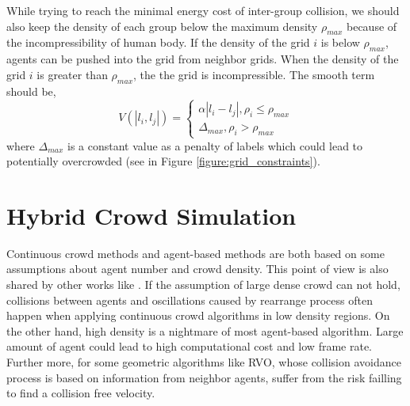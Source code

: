 \documentclass{egpubl}
\begin{document}
While trying to reach the minimal energy cost of inter-group collision, we should also keep the density of each group below the maximum density $\rho_{max}$ because of the incompressibility of human body. If the density of the grid $i$ is below $\rho_{max}$, agents can be pushed into the grid from neighbor grids. When the density of the grid $i$ is greater than $\rho_{max}$, the the grid is incompressible. The smooth term should be,
\begin{equation}
\label{eq:7}
V(\left|l_i,l_j\right|) = \left\{ 
{\begin{array}
{*{20}{c}}
{\alpha \left| {{l_i} - {l_j}} \right|,  {\rho _i} \le {\rho _{max}}}\\
{\Delta _{max},  {\rho _i} > {\rho _{max}}}
\end{array}} 
\right.
\end{equation}
where $\Delta_{max}$ is a constant value as a penalty of labels which could lead to potentially overcrowded (see in Figure \ref{figure:grid_constraints}).

\section{Hybrid Crowd Simulation}
\label{section:4}

Continuous crowd methods and agent-based methods are both based on some assumptions about agent number and crowd density. This point of view is also shared by other works like \cite{Golas:2013}. If the assumption of large dense crowd can not hold, collisions between agents and oscillations caused by rearrange process often happen when applying continuous crowd algorithms in low density regions. On the other hand, high density is a nightmare of most agent-based algorithm. Large amount of agent could lead to high computational cost and low frame rate. Further more, for some geometric algorithms like RVO, whose collision avoidance process is based on information from neighbor agents, suffer from the risk failling to find a collision free velocity. 
\end{document}
